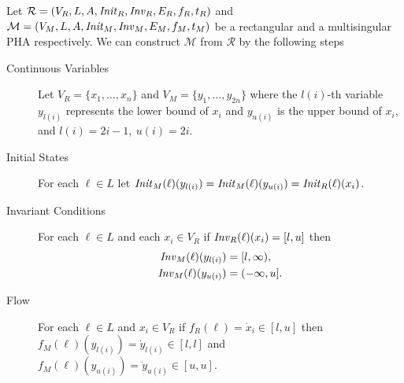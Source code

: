 Let $\mathcal{R} = (V_{R},L,A,\mathit{Init}_{R},\mathit{Inv}_{R},E_{R},f_{R},t_{R})$ and $\mathcal{M} = (V_{M}, L, A, \mathit{Init}_{M}, \mathit{Inv}_{M}, E_{M}, f_{M}, t_{M})$ be a rectangular and a multisingular PHA respectively. We can construct $\mathcal{M}$ from $\mathcal{R}$ by the following steps
\begin{description}
    \item[Continuous Variables] Let $V_{R}=\{x_{1},\ldots,x_{n}\}$ and $V_{M}=\{y_{1},\ldots,y_{2n}\}$ where the $l(i)$-th variable $y_{l(i)}$ represents the lower bound of $x_{i}$ and $y_{u(i)}$ is the upper bound of $x_{i}$, and $l(i)=2i-1,\ u(i)=2i$.

    \item[Initial States] For each $\ell\in L$ let $\mathit{Init}_{M}(\ell)(y_{l(i)})=\mathit{Init}_{M}(\ell)(y_{u(i)})=\mathit{Init}_{R}(\ell)(x_{i})$.

    \item[Invariant Conditions] For each $\ell\in L$ and each $x_{i}\in V_{R}$ if $\mathit{Inv}_{R}(\ell)(x_{i})=[l,u]$ then
    \begin{align*}
    \mathit{Inv}_{M}(\ell)(y_{l(i)}) & = [l,\infty), \\
    \mathit{Inv}_{M}(\ell)(y_{u(i)}) & = (-\infty,u].
    \end{align*}
    \item[Flow] For each $\ell\in L$ and $x_{i}\in V_{R}$ if $f_{R}(\ell)=\dot{x}_{i}\in[l,u]$ then $f_{M}(\ell)(y_{l(i)})= \dot{y}_{l(i)}\in[l,l]$ and $f_{M}(\ell)(y_{u(i)}) = \dot{y}_{u(i)}\in[u,u]$.


\end{description}
